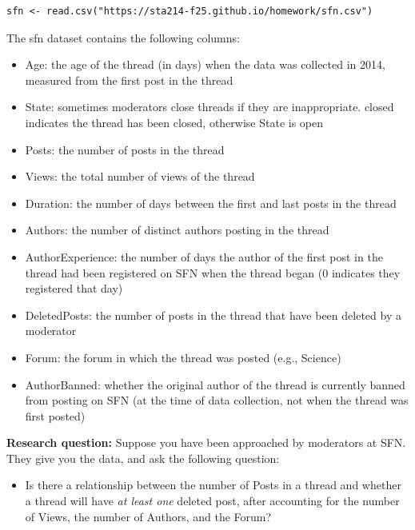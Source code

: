 \documentclass[11pt]{article}
\begin{document}
\begin{verbatim}
sfn <- read.csv("https://sta214-f25.github.io/homework/sfn.csv")
\end{verbatim}

\noindent The sfn dataset contains the following columns:

\begin{itemize}
\item Age: the age of the thread (in days) when the data was collected in 2014, measured from the first post in the thread
\item State: sometimes moderators close threads if they are inappropriate. closed indicates the thread has been closed, otherwise State is open
\item Posts: the number of posts in the thread
\item Views: the total number of views of the thread
\item Duration: the number of days between the first and last posts in the thread
\item Authors: the number of distinct authors posting in the thread
\item AuthorExperience: the number of days the author of the first post in the thread had been registered on SFN when the thread began (0 indicates they registered that day)
\item DeletedPosts: the number of posts in the thread that have been deleted by a moderator
\item Forum: the forum in which the thread was posted (e.g., Science)
\item AuthorBanned: whether the original author of the thread is currently banned from posting on SFN (at the time of data collection, not when the thread was first posted)
\end{itemize}

\noindent \textbf{Research question:} Suppose you have been approached by moderators at SFN. They give you the data, and ask the following question:
\begin{itemize}
\item Is there a relationship between the number of Posts in a thread and whether a thread will have \textit{at least one} deleted post, after accounting for the number of Views, the number of Authors, and the Forum?
\end{itemize}
\end{document}
